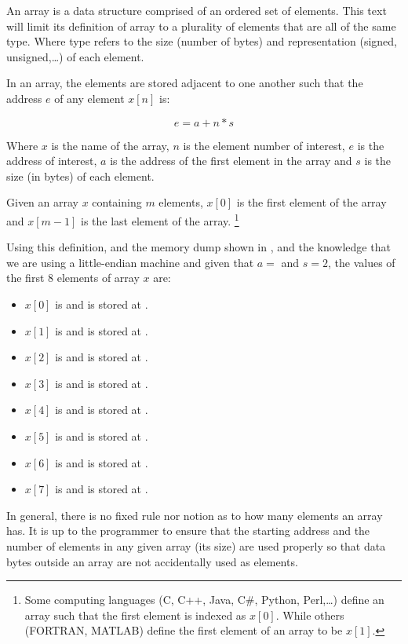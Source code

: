 An array is a data structure comprised of an ordered set of elements.
This text will limit its definition of array to a plurality of
elements that are all of the same type.  Where type
refers to the size (number of bytes) and representation (signed,
unsigned,\ldots) of each element.

In an array, the elements are stored adjacent to one another such that the
address $e$ of any element $x[n]$ is:

\begin{equation}
e = a + n * s
\end{equation}

Where $x$ is the name of the array, $n$ is the element number of interest, 
$e$ is the address of interest, $a$ is the address of the first element in 
the array and $s$ is the size (in bytes) of each element.

Given an array $x$ containing $m$ elements, $x[0]$ is the first element of 
the array and $x[m-1]$ is the last element of the array.%
\footnote{Some computing languages (C, C++, Java, C\#, Python, Perl,\ldots) 
define an array such that the first element is indexed as $x[0]$.  
While others (FORTRAN, MATLAB) define the first element of an 
array to be $x[1]$.}

Using this definition, and the memory dump shown in 
, and the knowledge that 
we are using a little-endian machine and given that
$a = $  and $s = 2$, the values of the first 8 elements 
of array $x$ are:

\begin{itemize}
\item $x[0]$ is  and is stored at .
\item $x[1]$ is  and is stored at .
\item $x[2]$ is  and is stored at .
\item $x[3]$ is  and is stored at .
\item $x[4]$ is  and is stored at .
\item $x[5]$ is  and is stored at .
\item $x[6]$ is  and is stored at .
\item $x[7]$ is  and is stored at .
\end{itemize}

\begin{tcolorbox}
In general, there is no fixed rule nor notion as to how many 
elements an array has.  It is up to the programmer to ensure that
the starting address and the number of elements in any given array
(its size) are used properly so that data bytes outside an array
are not accidentally used as elements.
\end{tcolorbox}

